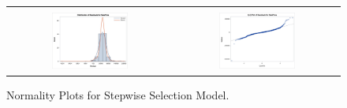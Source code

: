 \documentclass[11pt]{scrartcl} %
\begin{document}
\begin{figure}[H] %
	\centering
	\begin{tabular}{p{} p{}}
\hline	
	\multicolumn{1}{|c}{} &  \multicolumn{1}{c|}{} \\
		\multicolumn{1}{|c}{\includegraphics[width=0.48\textwidth]{../graphics/A2SWHist}} &
		\multicolumn{1}{c|}{\includegraphics[width=0.48\textwidth]{../graphics/A2SWqq}}\\
		\hline
	\end{tabular}		
	\caption{Normality Plots for Stepwise Selection Model.}
	\label{fig:A2SWQQ}
\end{figure}
\end{document}
